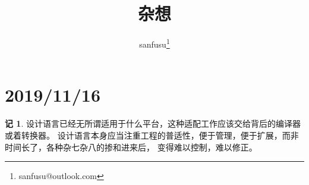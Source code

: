 \documentclass{ctexart}
\theoremstyle{definition} \newtheorem{note}{记}[section]
\begin{document}
\title{杂想}
\author{sanfusu\thanks{sanfusu@outlook.com}}
\maketitle

\section{2019/11/16}
\begin{note}
    设计语言已经无所谓适用于什么平台，这种适配工作应该交给背后的编译器或着转换器。
    设计语言本身应当注重工程的普适性，便于管理，便于扩展，而非时间长了，各种杂七杂八的掺和进来后，
    变得难以控制，难以修正。
\end{note}
\end{document}
